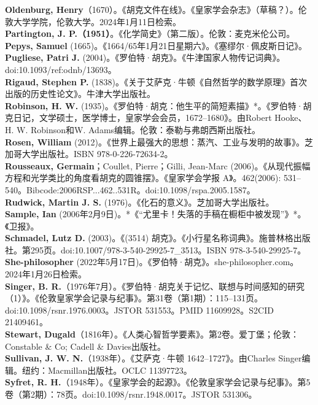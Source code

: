 \textbf{Oldenburg, Henry}（1670）。《胡克文件在线》。《皇家学会杂志》（草稿？）。伦敦大学学院，伦敦大学。2024年1月11日检索。\\
\textbf{Partington, J. P.（1951）}。《化学简史》（第二版）。伦敦：麦克米伦公司。\\
\textbf{Pepys, Samuel} (1665)。《1664/65年1月21日星期六》。《塞缪尔·佩皮斯日记》。\\
\textbf{Pugliese, Patri J.} (2004)。《罗伯特·胡克》。《牛津国家人物传记词典》。doi:10.1093/ref:odnb/13693。\\
\textbf{Rigaud, Stephen P.} (1838)。《关于艾萨克·牛顿《自然哲学的数学原理》首次出版的历史性论文》。牛津大学出版社。\\
\textbf{Robinson, H. W.} (1935)。《罗伯特·胡克：他生平的简短素描》*。《罗伯特·胡克日记，文学硕士，医学博士，皇家学会会员，1672–1680》。由Robert Hooke、H. W. Robinson和W. Adams编辑。伦敦：泰勒与弗朗西斯出版社。\\
\textbf{Rosen, William }(2012)。《世界上最强大的思想：蒸汽、工业与发明的故事》。芝加哥大学出版社。ISBN 978-0-226-72634-2。\\
\textbf{Rousseaux, Germain}；Coullet, Pierre；Gilli, Jean-Marc (2006)。《从现代振幅方程和光学类比的角度看胡克的圆锥摆》。《皇家学会学报 A》。462(2006): 531–540。Bibcode:2006RSP...462..531R。doi:10.1098/rspa.2005.1587。\\
\textbf{Rudwick, Martin J. S.} (1976)。《化石的意义》。芝加哥大学出版社。\\
\textbf{Sample, Ian} (2006年2月9日)。*《“尤里卡！失落的手稿在橱柜中被发现”》*。《卫报》。\\
\textbf{Schmadel, Lutz D.} (2003)。《(3514) 胡克》。《小行星名称词典》。施普林格出版社。第295页。doi:10.1007/978-3-540-29925-7_3513。ISBN 978-3-540-29925-7。\\
\textbf{She-philosopher} (2022年5月17日)。《罗伯特·胡克》。she-philosopher.com。2024年1月26日检索。\\
\textbf{Singer, B. R.}（1976年7月）。《罗伯特·胡克关于记忆、联想与时间感知的研究（1）》。《伦敦皇家学会记录与纪事》。第31卷（第1期）：115–131页。doi:10.1098/rsnr.1976.0003。JSTOR 531553。PMID 11609928。S2CID 21409461。\\
\textbf{Stewart, Dugald}（1816年）。《人类心智哲学要素》。第2卷。爱丁堡；伦敦：Constable & Co; Cadell & Davies出版社。\\
\textbf{Sullivan, J. W. N.}（1938年）。《艾萨克·牛顿 1642–1727》。由Charles Singer编辑。纽约：Macmillan出版社。OCLC 11397723。\\
\textbf{Syfret, R. H.}（1948年）。《皇家学会的起源》。《伦敦皇家学会记录与纪事》。第5卷（第2期）：78页。doi:10.1098/rsnr.1948.0017。JSTOR 531306。\\
